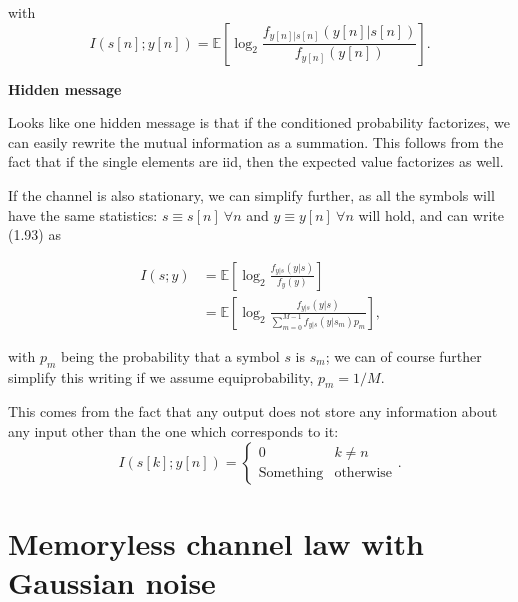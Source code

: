 \documentclass[a4paper, 11pt]{book}
\begin{document}
with
\begin{equation}
I(s[n]; y[n]) = \mathbb{E}\left[ \log_2 \frac{f_{y[n]|s[n]}(y[n]|s[n])}{f_{y[n]}(y[n])} \right] \text{.} \tag{1.93}
\end{equation}

\begin{tcolorbox}[colframe=teal!70!white, colback=white, boxrule=1pt, arc=2pt]
    \textcolor{teal!70!white}{\textbf{ Hidden message}}
    
    Looks like one hidden message is that if the conditioned probability factorizes, we can easily rewrite the mutual information as a summation.
    This follows from the fact that if the single elements are iid, then the expected value factorizes as well.
\end{tcolorbox}

\vspace{1em}

If the channel is also \textcolor{green!60!black}{stationary}, we can simplify further, as all the symbols will have the same statistics: $s \equiv s[n] \ \forall n$ and $y \equiv y[n] \ \forall n$ will hold, and can write (1.93) as

\begin{align}
I(s; y) &= \mathbb{E}\left[ \log_2 \frac{f_{y|s}(y|s)}{f_y(y)} \right] \tag{1.94} \\
&= \mathbb{E}\left[ \log_2 \frac{f_{y|s}(y|s)}{\sum_{m=0}^{M-1} f_{y|s}(y|s_m)p_m} \right] \text{,} \tag{1.95}
\end{align}

with $p_m$ being the probability that a symbol $s$ is $s_m$; we can of course further simplify this writing if we assume equiprobability, $p_m = 1/M$.

\begin{tcolorbox}[frame empty, sharp corners, boxrule=0pt, leftrule=2pt, colframe=green!60!black, colback=green!5, left=5pt, top=5pt, bottom=5pt]
    This comes from the fact that any output does not store any information about any input other than the one which corresponds to it:
    $$
    I(s[k]; y[n]) = 
    \begin{cases} 
    0 & k \neq n \\
    \text{Something} & \text{otherwise}
    \end{cases} \text{.}
    $$
\end{tcolorbox}

\section{Memoryless channel law with Gaussian noise}
\end{document}
